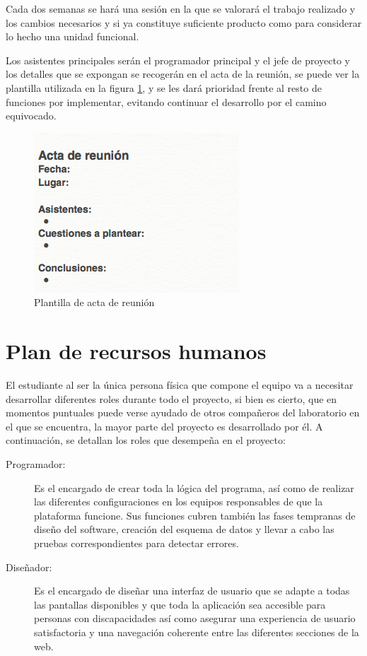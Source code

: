 \documentclass{DeustoFDP}
\begin{document}
Cada dos semanas se hará una sesión en la que se valorará el trabajo realizado y los cambios necesarios y si ya constituye suficiente producto como para considerar lo hecho una unidad funcional. 

\newpage
Los asistentes principales serán el programador principal y el jefe de proyecto y los detalles que se expongan se recogerán en el acta de la reunión, se puede ver la plantilla utilizada en la figura \ref{fig:Actareunion}, y se les dará prioridad frente al resto de funciones por implementar, evitando continuar el desarrollo por el camino equivocado.

\begin{figure}[h]
\centering
\includegraphics[width=0.7\linewidth]{fig/Actareunion}
\caption[Plantilla de acta de reunión]{Plantilla de acta de reunión}
\label{fig:Actareunion}
\end{figure}

\section{Plan de recursos humanos}
El estudiante al ser la única persona física que compone el equipo va a necesitar desarrollar diferentes roles durante todo el proyecto, si bien es cierto, que en momentos puntuales puede verse ayudado de otros compañeros del laboratorio en el que se encuentra, la mayor parte del proyecto es desarrollado por él. A continuación, se detallan los roles que desempeña en el proyecto:

\begin{description}
	\item[Programador:] Es el encargado de crear toda la lógica del programa, así como de realizar las diferentes configuraciones en los equipos responsables de que la plataforma funcione. Sus funciones cubren también las fases tempranas de diseño del software, creación del esquema de datos y llevar a cabo las pruebas correspondientes para detectar errores.
	\item[Diseñador:] Es el encargado de diseñar una interfaz de usuario que se adapte a todas las pantallas disponibles y que toda la aplicación sea accesible para personas con discapacidades así como asegurar una experiencia de usuario satisfactoria y una navegación coherente entre las diferentes secciones de la web.
\end{description}
\end{document}
